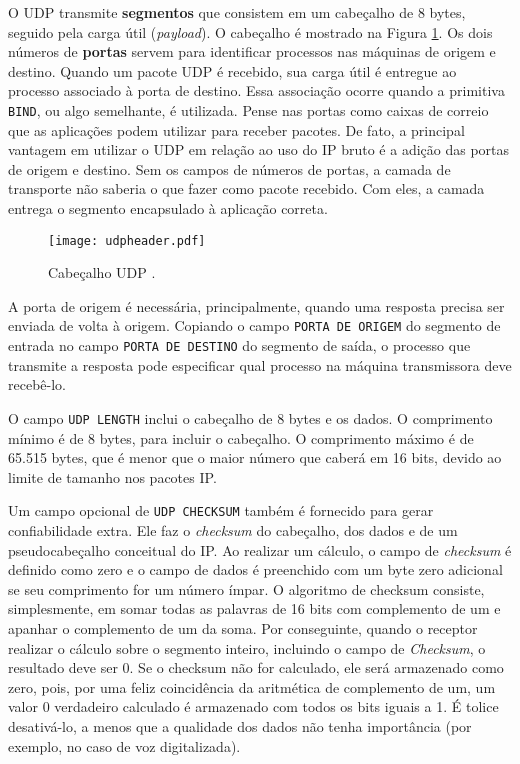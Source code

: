 \documentclass[12pt]{article}
\begin{document}
O UDP transmite \textbf{segmentos} que consistem em um cabeçalho de 8 bytes, seguido
pela carga útil (\textit{payload}). O cabeçalho é mostrado na Figura \ref{fig:udpheader}.
Os dois números de \textbf{portas} servem para identificar processos nas máquinas de
origem e destino. Quando um pacote UDP é recebido, sua carga útil é entregue ao processo
associado à porta de destino. Essa associação ocorre quando a primitiva \texttt{BIND},
ou algo semelhante, é utilizada. Pense nas portas como caixas de correio que as aplicações
podem utilizar para receber pacotes. De fato, a principal vantagem em utilizar o UDP em
relação ao uso do IP bruto é a adição das portas de origem e destino. Sem os campos de
números de portas, a camada de transporte não saberia o que fazer como pacote recebido.
Com eles, a camada entrega o segmento encapsulado à aplicação correta.

\begin{figure}[ht]
  \centering
  \texttt{[image: udpheader.pdf]}
  \caption{Cabeçalho UDP \cite{tanembaum2021}.}
  \label{fig:udpheader}
\end{figure}

A porta de origem é necessária, principalmente, quando uma resposta precisa ser enviada
de volta à origem. Copiando o campo \texttt{PORTA DE ORIGEM} do segmento de entrada no
campo \texttt{PORTA DE DESTINO} do segmento de saída, o processo que transmite a
resposta pode especificar qual processo na máquina transmissora deve recebê-lo.

O campo \texttt{UDP LENGTH} inclui o cabeçalho de 8 bytes e os dados. O comprimento
mínimo é de 8 bytes, para incluir o cabeçalho. O comprimento máximo é de 65.515 bytes,
que é menor que o maior número que caberá em 16 bits, devido ao limite de tamanho nos
pacotes IP.

Um campo opcional de \texttt{UDP CHECKSUM} também é fornecido para gerar confiabilidade
extra. Ele faz o \textit{checksum} do cabeçalho, dos dados e de um pseudocabeçalho
conceitual do IP. Ao realizar um cálculo, o campo de \textit{checksum} é definido como
zero e o campo de dados é preenchido com um byte zero adicional se seu comprimento for
um número ímpar. O algoritmo de checksum consiste, simplesmente, em somar todas as
palavras de 16 bits com complemento de um e apanhar o complemento de um da soma. Por
conseguinte, quando o receptor realizar o cálculo sobre o segmento inteiro, incluindo
o campo de \textit{Checksum}, o resultado deve ser 0. Se o checksum não for calculado,
ele será armazenado como zero, pois, por uma feliz coincidência da aritmética de
complemento de um, um valor 0 verdadeiro calculado é armazenado com todos os bits iguais
a 1. É tolice desativá-lo, a menos que a qualidade dos dados não tenha importância
(por exemplo, no caso de voz digitalizada).
\end{document}
